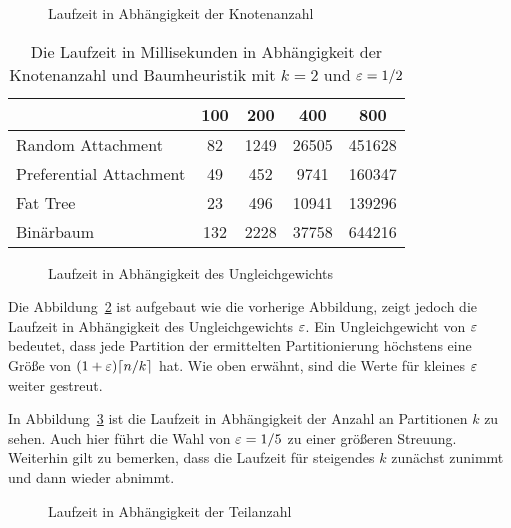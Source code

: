\begin{figure}[t]
    \centering
    
    \caption{Laufzeit in Abhängigkeit der Knotenanzahl\label{fig:runnodes}}
\end{figure}

\vspace{0.5cm}
\begin{table}[H]
    \centering
    \begin{tabular}{l*{4}{c}}
        \toprule
        & 100 & 200 & 400 & 800 \\
        \midrule
        Random Attachment & 82 & 1249 & 26505 & 451628 \\ 
        Preferential Attachment & 49 & 452 & 9741 & 160347 \\
        Fat Tree & 23 & 496 & 10941 & 139296 \\ 
        Binärbaum & 132 & 2228 & 37758 & 644216 \\ 
        \bottomrule
    \end{tabular}
    \caption{Die Laufzeit in Millisekunden in Abhängigkeit der Knotenanzahl und Baumheuristik mit $k=2$ und $\varepsilon=1/2$\label{tab:highnodecnt}}
\end{table}

\begin{figure}[H]
    \centering
    
    \caption{Laufzeit in Abhängigkeit des Ungleichgewichts\label{fig:runimb}}
\end{figure}

Die Abbildung~\ref{fig:runimb} ist aufgebaut wie die vorherige Abbildung, zeigt jedoch die Laufzeit in Abhängigkeit des Ungleichgewichts $\varepsilon$.
Ein Ungleichgewicht von $\varepsilon$ bedeutet, dass jede Partition der ermittelten Partitionierung höchstens eine Größe von $(1 + \varepsilon) \lceil n/k\rceil$ hat.
Wie oben erwähnt, sind die Werte für kleines $\varepsilon$ weiter gestreut.

In Abbildung~\ref{fig:runkparts} ist die Laufzeit in Abhängigkeit der Anzahl an Partitionen $k$ zu sehen.
Auch hier führt die Wahl von $\varepsilon=1/5$ zu einer größeren Streuung.
Weiterhin gilt zu bemerken, dass die Laufzeit für steigendes $k$ zunächst zunimmt und dann wieder abnimmt.

\begin{figure}[H]
    \centering
    
    \caption{Laufzeit in Abhängigkeit der Teilanzahl\label{fig:runkparts}}
\end{figure}

